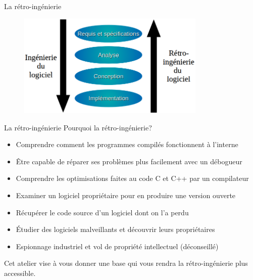 \documentclass[10pt,xcolor={table,dvipsnames},t]{beamer}
\begin{document}
\begin{frame}{La rétro-ingénierie}
    \begin{figure}%
        \includegraphics[width=0.80\textwidth]{inglog}
    \end{figure}
\end{frame}


\begin{frame}{La rétro-ingénierie}
    Pourquoi la rétro-ingénierie?
    \begin{itemize}
        \item Comprendre comment les programmes compilés fonctionnent à l'interne
        \item Être capable de réparer ses problèmes plus facilement avec un débogueur
        \item Comprendre les optimisations faites au code C et C++ par un compilateur
        \item Examiner un logiciel propriétaire pour en produire une version ouverte
        \item Récupérer le code source d'un logiciel dont on l'a perdu
        \item Étudier des logiciels malveillants et découvrir leurs propriétaires
        \item Espionnage industriel et vol de propriété intellectuel (déconseillé)
        \newline
    \end{itemize}
    Cet atelier vise à vous donner une base qui vous rendra la rétro-ingénierie plus accessible.
\end{frame}
\end{document}
